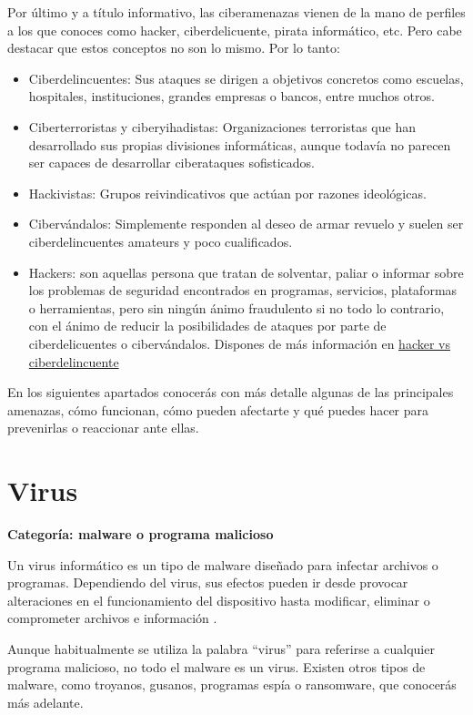 \documentclass[
  spanish,
  a4paper,
  openany]{book}
\begin{document}
Por último y a título informativo, las ciberamenazas vienen de la mano de perfiles a los que conoces como hacker, ciberdelicuente, pirata informático, etc. Pero cabe destacar que estos conceptos no son lo mismo. Por lo tanto:

\begin{itemize}
\item
  Ciberdelincuentes: Sus ataques se dirigen a objetivos concretos como escuelas, hospitales, instituciones, grandes empresas o bancos, entre muchos otros.
\item
  Ciberterroristas y ciberyihadistas: Organizaciones terroristas que han desarrollado sus propias divisiones informáticas, aunque todavía no parecen ser capaces de desarrollar ciberataques sofisticados.
\item
  Hackivistas: Grupos reivindicativos que actúan por razones ideológicas.
\item
  Cibervándalos: Simplemente responden al deseo de armar revuelo y suelen ser ciberdelincuentes amateurs y poco cualificados.
\item
  Hackers: son aquellas persona que tratan de solventar, paliar o informar sobre los problemas de seguridad encontrados en programas, servicios, plataformas o herramientas, pero sin ningún ánimo fraudulento si no todo lo contrario, con el ánimo de reducir la posibilidades de ataques por parte de ciberdelicuentes o cibervándalos. Dispones de más información en \href{https://www.incibe.es/aprendeciberseguridad/hacker-vs-ciberdelincuente}{hacker vs ciberdelincuente}
\end{itemize}

En los siguientes apartados conocerás con más detalle algunas de las principales amenazas, cómo funcionan, cómo pueden afectarte y qué puedes hacer para prevenirlas o reaccionar ante ellas.

\section{Virus}\label{virus}

\textbf{Categoría: malware o programa malicioso}

Un virus informático es un tipo de malware diseñado para infectar archivos o programas. Dependiendo del virus, sus efectos pueden ir desde provocar alteraciones en el funcionamiento del dispositivo hasta modificar, eliminar o comprometer archivos e información \citep{WIKI-virus}.

Aunque habitualmente se utiliza la palabra ``virus'' para referirse a cualquier programa malicioso, no todo el malware es un virus. Existen otros tipos de malware, como troyanos, gusanos, programas espía o ransomware, que conocerás más adelante.
\end{document}
